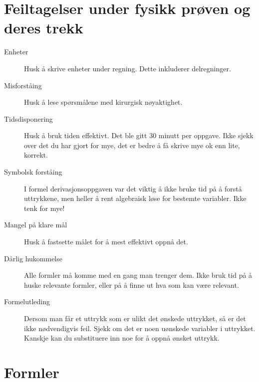 \documentclass{article}
\numberwithin{equation}{section}
\begin{document}
\section{Feiltagelser under fysikk prøven og deres trekk}
\begin{description}
  \item [Enheter] Husk å skrive enheter under regning. Dette inkluderer delregninger.
  \item [Misforståing] Husk å lese spørsmålene med kirurgisk nøyaktighet.
  \item [Tidsdisponering] Husk å bruk tiden effektivt.
    Det ble gitt 30 minutt per oppgave. Ikke sjekk over det du har gjort for mye, det er bedre å få skrive mye ok enn lite, korrekt.
  \item [Symbolsk forståing] I formel derivasjonsoppgaven var det viktig å ikke bruke tid på å forstå uttrykkene, men heller å rent algebraisk løse for bestemte variabler.
    Ikke tenk for mye!
  \item [Mangel på klare mål] Husk å fastsette målet for å mest effektivt oppnå det.
  \item [Dårlig hukommelse] Alle formler må komme med en gang man trenger dem.
    Ikke bruk tid på å huske relevante formler, eller på å finne ut hva som kan være relevant.
  \item [Formelutleding] Dersom man får et uttrykk som er ulikt det ønskede uttrykket, så er det ikke nødvendigvis feil.
    Sjekk om det er noen uønskede variabler i uttrykket.
    Kanskje kan du substituere inn noe for å oppnå ønsket uttrykk.
\end{description}
\section{Formler}
\end{document}
